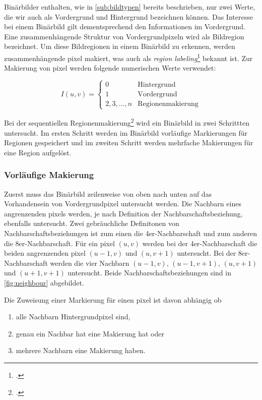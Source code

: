 Binärbilder enthalten, wie in \autoref{sub:bildtypen} bereits beschrieben, nur zwei Werte, die wir auch als Vordergrund
 und Hintergrund bezeichnen können. Das Interesse bei einem Binärbild gilt dementsprechend den Informationen im
 Vordergrund. Eine zusammenhängende Struktur von Vordergrundpixeln wird als Bildregion bezeichnet. Um diese
 Bildregionen in einem Binärbild zu erkennen, werden zusammenhängende \gls{pixel} makiert, was auch als
 \textit{region labeling}\footcite[Vgl.][S.~196]{burger05} bekannt ist. Zur Makierung von \gls{pixel} werden folgende
 numerischen Werte verwendet:

\begin{equation*}
	I(u,v) = \begin{cases}
	0 & \textrm{Hintergrund}\\
	1 & \textrm{Vordergrund}\\
	2,3,\ldots,n & \textrm{Regionenmakierung}
	\end{cases}
\end{equation*}

Bei der sequentiellen Regionenmakierung\footcite[Vgl.][S.~200--206]{burger05} wird ein Binärbild in zwei Schrittten
 untersucht. Im ersten Schritt werden im Binärbild vorläufige Markierungen für Regionen gespeichert und im zweiten
 Schritt werden mehrfache Makierungen für eine Region aufgelöst.

\subsubsection{Vorläufige Makierung} %
\label{sec:vorläufige_makierung}

Zuerst muss das Binärbild zeilenweise von oben nach unten auf das Vorhandensein von Vordergrundpixel untersucht werden.
Die Nachbarn eines angrenzenden \glspl{pixel} werden, je nach Definition der Nachbarschaftsbeziehung, ebenfalls
 untersucht. Zwei gebräuchliche Definitonen von Nachbarschaftsbeziehungen ist zum einen die 4er-Nachbarschaft und zum
 anderen die 8er-Nachbarschaft. Für ein \gls{pixel} $(u,v)$ werden bei der 4er-Nachbarschaft die beiden angrenzenden
 \gls{pixel} $(u-1,v)$ und $(u,v+1)$ untersucht. Bei der 8er-Nachbarschaft werden die vier Nachbarn $(u-1,v)$,
 $(u-1,v+1)$, $(u,v+1)$ und $(u+1,v+1)$ untersucht. Beide Nachbarschaftsbeziehungen sind in \autoref{fig:neighbour}
 abgebildet.

Die Zuweisung einer Markierung für einen \gls{pixel} ist davon abhängig ob

\begin{enumerate}
	\item alle Nachbarn Hintergrundpixel sind, \label{labeling-all-background}
	\item genau ein Nachbar hat eine Makierung hat oder \label{labeling-one-neighbour}
	\item mehrere Nachbarn eine Makierung haben. \label{labeling-many-neighbours}
\end{enumerate}

